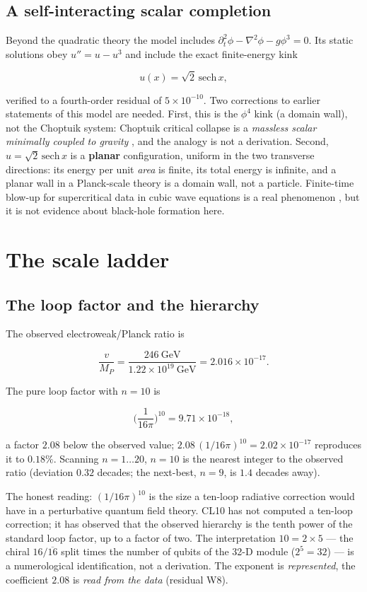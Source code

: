 \documentclass[aps,prd,amsmath,amssymb,superscriptaddress,longbibliography,floatfix,preprint]{revtex4-2}
\begin{document}
\subsection{A self-interacting scalar completion}

Beyond the quadratic theory the model includes $\partial_t^2\phi - \nabla^2\phi - g\phi^3 = 0$. Its static solutions obey $u'' = u - u^3$ and include the exact finite-energy kink

\[u(x) = \sqrt{2}\,\mathrm{sech}\,x,\]

verified to a fourth-order residual of $5\times10^{-10}$. Two corrections to earlier statements of this model are needed. First, this is the $\phi^4$ kink (a domain wall), not the Choptuik system: Choptuik critical collapse is a \emph{massless scalar minimally coupled to gravity} \cite{ref22}, and the analogy is not a derivation. Second, $u = \sqrt2\,\allowbreak{}\mathrm{sech}\,\allowbreak{}x$ is a \textbf{planar} configuration, uniform in the two transverse directions: its energy per unit \emph{area} is finite, its total energy is infinite, and a planar wall in a Planck-scale theory is a domain wall, not a particle. Finite-time blow-up for supercritical data in cubic wave equations is a real phenomenon \cite{ref23}, but it is not evidence about black-hole formation here.

\section{The scale ladder}

\subsection{The loop factor and the hierarchy}

The observed electroweak/Planck ratio is

\[\frac{v}{M_P} = \frac{246\ \mathrm{GeV}}{1.22\times10^{19}\ \mathrm{GeV}} = 2.016\times10^{-17}.\]

The pure loop factor with $n = 10$ is

\[\Big(\frac{1}{16\pi}\Big)^{10} = 9.71\times10^{-18},\]

a factor $2.08$ below the observed value; $2.08\,\allowbreak{}(1/16\pi)^{10} = 2.02\times10^{-17}$ reproduces it to $0.18\%$. Scanning $n = 1\dots20$, $n = 10$ is the nearest integer to the observed ratio (deviation $0.32$ decades; the next-best, $n = 9$, is $1.4$ decades away).

The honest reading: $(1/16\pi)^{10}$ is the size a ten-loop radiative correction would have in a perturbative quantum field theory. CL10 has not computed a ten-loop correction; it has observed that the observed hierarchy is the tenth power of the standard loop factor, up to a factor of two. The interpretation $10 = 2\times 5$ --- the chiral $16/\overline{16}$ split times the number of qubits of the 32-D module ($2^5 = 32$) --- is a numerological identification, not a derivation. The exponent is \emph{represented}, the coefficient $2.08$ is \emph{read from the data} (residual W8).
\end{document}
